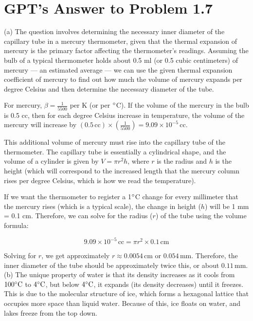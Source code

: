 \documentclass[12pt]{article}
\begin{document}
\section*{GPT's Answer to Problem 1.7}

\noindent (a) The question involves determining the necessary inner diameter of the capillary tube in a mercury thermometer, given that the thermal expansion of mercury is the primary factor affecting the thermometer's readings. Assuming the bulb of a typical thermometer holds about 0.5 ml (or 0.5 cubic centimeters) of mercury — an estimated average — we can use the given thermal expansion coefficient of mercury to find out how much the volume of mercury expands per degree Celsius and then determine the necessary diameter of the tube.

For mercury, $\beta = \frac{1}{5500}$ per K (or per $\degree$C). If the volume of the mercury in the bulb is 0.5 cc, then for each degree Celsius increase in temperature, the volume of the mercury will increase by $(0.5 \, \text{cc}) \times (\frac{1}{5500}) = 9.09 \times 10^{-5} \, \text{cc}$.

This additional volume of mercury must rise into the capillary tube of the thermometer. The capillary tube is essentially a cylindrical shape, and the volume of a cylinder is given by $V = \pi r^2 h$, where $r$ is the radius and $h$ is the height (which will correspond to the increased length that the mercury column rises per degree Celsius, which is how we read the temperature).

If we want the thermometer to register a 1$\degree$C change for every millimeter that the mercury rises (which is a typical scale), the change in height ($h$) will be 1 mm = 0.1 cm. Therefore, we can solve for the radius ($r$) of the tube using the volume formula:

\[
9.09 \times 10^{-5} \, \text{cc} = \pi r^2 \times 0.1 \, \text{cm}
\]

Solving for $r$, we get approximately $r \approx 0.0054 \, \text{cm}$ or $0.054 \, \text{mm}$. Therefore, the inner diameter of the tube should be approximately twice this, or about $0.11 \, \text{mm}$. \\

\noindent (b) The unique property of water is that its density increases as it cools from $100\degree\mathrm{C}$ to $4\degree\mathrm{C}$, but below $4\degree\mathrm{C}$, it expands (its density decreases) until it freezes. This is due to the molecular structure of ice, which forms a hexagonal lattice that occupies more space than liquid water. Because of this, ice floats on water, and lakes freeze from the top down.
\end{document}
